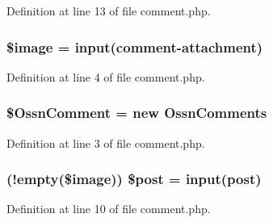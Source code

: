 Definition at line 13 of file comment.\+php.

\subsubsection[{\texorpdfstring{\$image}{$image}}]{\setlength{\rightskip}{0pt plus 5cm}\$image = {\bf input}(\textquotesingle{}comment-\/attachment\textquotesingle{})}\hypertarget{actions_2post_2comment_8php_aac6146b4cdec66c94263ddb55afd5946}{}\label{actions_2post_2comment_8php_aac6146b4cdec66c94263ddb55afd5946}


Definition at line 4 of file comment.\+php.

\subsubsection[{\texorpdfstring{\$\+Ossn\+Comment}{$OssnComment}}]{\setlength{\rightskip}{0pt plus 5cm}\$Ossn\+Comment = new {\bf Ossn\+Comments}}\hypertarget{actions_2post_2comment_8php_a72b9fc252071bb4b4ec3ba0e1dc24760}{}\label{actions_2post_2comment_8php_a72b9fc252071bb4b4ec3ba0e1dc24760}


Definition at line 3 of file comment.\+php.

\subsubsection[{\texorpdfstring{\$post}{$post}}]{ (!empty(\$image)) \$post = {\bf input}(\textquotesingle{}post\textquotesingle{})}\hypertarget{actions_2post_2comment_8php_a4fb32f285a9d3229aeaca99a18372945}{}\label{actions_2post_2comment_8php_a4fb32f285a9d3229aeaca99a18372945}


Definition at line 10 of file comment.\+php.

